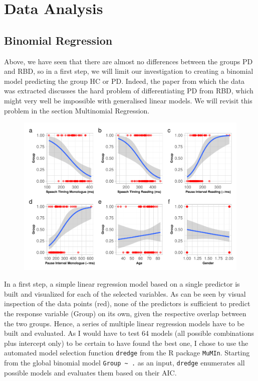 \documentclass[
  english,
  doc,floatsintext]{apa6}
\begin{document}
\hypertarget{data-analysis}{%
\section{Data Analysis}\label{data-analysis}}

\hypertarget{binomial-regression}{%
\subsection{Binomial Regression}\label{binomial-regression}}

Above, we have seen that there are almost no differences between the groups PD and RBD, so in a first step, we will limit our investigation to creating a binomial model predicting the group HC or PD. Indeed, the paper from which the data was extracted discusses the hard problem of differentiating PD from RBD, which might very well be impossible with generalised linear models. We will revisit this problem in the section Multinomial Regression.

\begin{figure}

{\centering \includegraphics{dap_report_anja_probst_files/figure-latex/simple-linear-regression-1} 

}

\caption{ }\label{fig:simple-linear-regression}
\end{figure}

In a first step, a simple linear regression model based on a single predictor is built and visualized for each of the selected variables. As can be seen by visual inspection of the data points (red), none of the predictors is sufficient to predict the response variable (Group) on its own, given the respective overlap between the two groups. Hence, a series of multiple linear regression models have to be built and evaluated. As I would have to test 64 models (all possible combinations plus intercept only) to be certain to have found the best one, I chose to use the automated model selection function \texttt{dredge} from the R package \texttt{MuMIn}. Starting from the global binomial model \texttt{Group\ \textasciitilde{}\ .} as an input, \texttt{dredge} enumerates all possible models and evaluates them based on their AIC.
\end{document}
